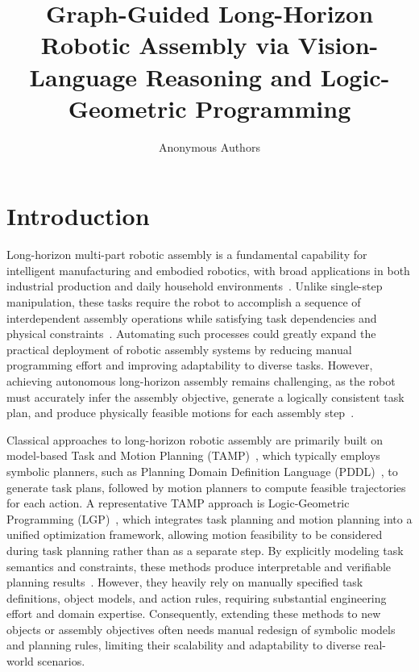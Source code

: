 \documentclass[letterpaper, 10 pt, conference]{ieeeconf}  %
\title{\LARGE \bf
Graph-Guided Long-Horizon Robotic Assembly via Vision-Language Reasoning and Logic-Geometric Programming}
\author{Anonymous Authors%
}
\begin{document}
\maketitle
\thispagestyle{empty}
\pagestyle{empty}


\begin{abstract}

\end{abstract}


\section{Introduction}

Long-horizon multi-part robotic assembly is a fundamental capability for intelligent manufacturing and embodied robotics, with broad applications in both industrial production and daily household environments~\cite{li2019survey,daneshmand2023industry}. 
Unlike single-step manipulation, these tasks require the robot to accomplish a sequence of interdependent assembly operations while satisfying task dependencies and physical constraints~\cite{jiang2022review}. 
Automating such processes could greatly expand the practical deployment of robotic assembly systems by reducing manual programming effort and improving adaptability to diverse tasks. 
However, achieving autonomous long-horizon assembly remains challenging, as the robot must accurately infer the assembly objective, generate a logically consistent task plan, and produce physically feasible motions for each assembly step~\cite{faccio2019collaborative}. 

Classical approaches to long-horizon robotic assembly are primarily built on model-based Task and Motion Planning (TAMP)~\cite{zhao2024survey,guo2023recent}, which typically employs symbolic planners, such as Planning Domain Definition Language (PDDL)~\cite{aeronautiques1998pddl,jiang2019task}, to generate task plans, followed by motion planners to compute feasible trajectories for each action.
A representative TAMP approach is Logic-Geometric Programming (LGP)~\cite{marc2015LGP}, which integrates task planning and motion planning into a unified optimization framework, allowing motion feasibility to be considered during task planning rather than as a separate step.
By explicitly modeling task semantics and constraints, these methods produce interpretable and verifiable planning results~\cite{toussaint2017multi}. 
However, they heavily rely on manually specified task definitions, object models, and action rules, requiring substantial engineering effort and domain expertise. 
Consequently, extending these methods to new objects or assembly objectives often needs manual redesign of symbolic models and planning rules, limiting their scalability and adaptability to diverse real-world scenarios.
\end{document}
